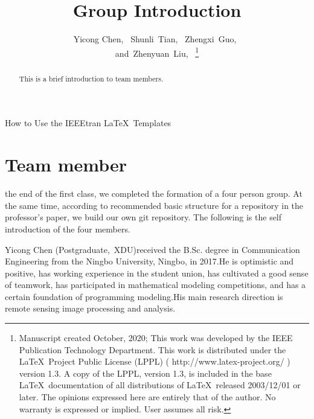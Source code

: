 \documentclass[lettersize,journal]{IEEEtran}
\begin{document}
\title{Group Introduction}

		\author{Yicong Chen,~
		Shunli~Tian,~
		Zhengxi~Guo,~
	
		and~Zhenyuan~Liu,~%
\thanks{Manuscript created October, 2020; This work was developed by the IEEE Publication Technology Department. This work is distributed under the \LaTeX \ Project Public License (LPPL) ( http://www.latex-project.org/ ) version 1.3. A copy of the LPPL, version 1.3, is included in the base \LaTeX \ documentation of all distributions of \LaTeX \ released 2003/12/01 or later. The opinions expressed here are entirely that of the author. No warranty is expressed or implied. User assumes all risk.}}

%
{How to Use the IEEEtran \LaTeX \ Templates}

\maketitle

\begin{abstract}
This is a brief introduction to team members.
\end{abstract}



\section{Team member}
 the end of the first class, we completed the formation of a four person group. At the same time, according to recommended basic structure for a repository in the professor's paper, we build our own git repository. The following is the self introduction of the four members. 



\begin{IEEEbiography}{Yicong Chen}
(Postgraduate,~XDU)received the B.Sc. degree in Communication Engineering from the Ningbo University, Ningbo, in 2017.He is optimistic and positive, has working experience in the student union, has cultivated a good sense of teamwork, has participated in mathematical modeling competitions, and has a certain foundation of programming modeling.His main research direction is remote sensing image processing and analysis.\end{IEEEbiography}
\end{document}
